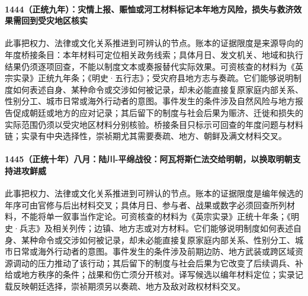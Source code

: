 \paragraph{1444（正统九年）：灾情上报、赈恤或河工材料标记本年地方风险，损失与救济效果需回到受灾地区核实} 此事把权力、法律或文化关系推进到可辨认的节点。账本的证据限度是来源导向的年度桥接条目：本年材料可定位相关政务线索；具体月日、发文机关、地域和执行结果仍须逐项回查，不能以制度文本或奏报替代实际效果。可资核查的材料为《英宗实录》正统九年条；《明史·五行志》；受灾府县地方志与奏疏。它们能够说明制度如何表述自身、某种命令或交涉如何被记录，却未必能直接复原家庭内部关系、性别分工、城市日常或海外行动者的意图。事件发生的条件涉及自然风险与地方报告促成朝廷或地方的应对记录；其后留下的制度与社会后果为赈济、迁徙和损失的实际范围仍须以受灾地区材料分别核验。桥接条目只标示可回查的年度问题与材料链；实录有中央选择性，崇祯期尤其需要奏疏、地方、朝鲜及满文材料交叉。

\paragraph{1445（正统十年）八月：陆川-平绵战役：阿瓦将斯仁法交给明朝，以换取明朝支持进攻鲜威} 此事把权力、法律或文化关系推进到可辨认的节点。账本的证据限度是编年候选的年序可由官修与后出材料交叉；具体月日、参与者、战果或数字必须回查所列材料，不能将单一叙事当作定论。可资核查的材料为《英宗实录》正统十年条；《明史·兵志》及相关列传；边镇、地方志或对方材料。它们能够说明制度如何表述自身、某种命令或交涉如何被记录，却未必能直接复原家庭内部关系、性别分工、城市日常或海外行动者的意图。事件发生的条件涉及前期边防、地方武装或跨区域资源调动的压力推动了该行动；其后留下的制度与社会后果为它改变了后续调兵、补给或地方秩序的条件；战果和伤亡须分开核对。译写候选以编年材料定位；实录记载反映朝廷选择，崇祯期须另以奏疏、地方及敌对政权材料交叉。
